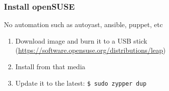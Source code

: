 \documentclass[aspectratio=169,11pt,hyperref={colorlinks=true}]{beamer}
\begin{document}
\begin{frame}
  \frametitle{Install openSUSE}
  No automation such as autoyast, ansible, puppet, etc
  \begin{enumerate}
    \item Download image and burn it to a USB stick (\url{https://software.opensuse.org/distributions/leap})
    \item Install from that media
    \item Update it to the latest: \texttt{\$ sudo zypper dup}
  \end{enumerate}
\end{frame}
\end{document}
